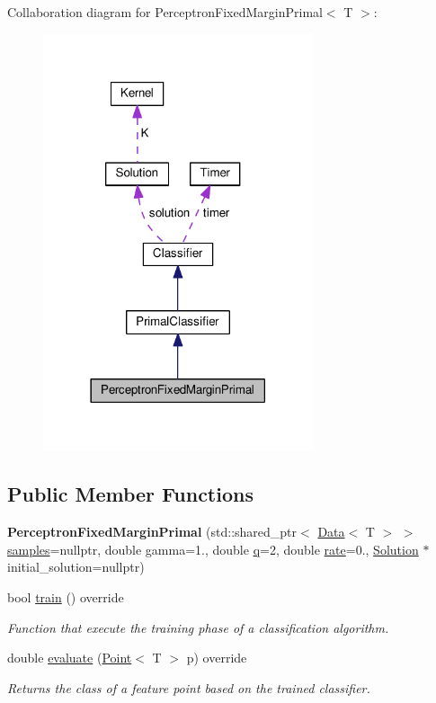 Collaboration diagram for Perceptron\+Fixed\+Margin\+Primal$<$ T $>$\+:\nopagebreak
\begin{figure}[H]
\begin{center}
\leavevmode
\includegraphics[width=225pt]{class_perceptron_fixed_margin_primal__coll__graph}
\end{center}
\end{figure}
\subsection*{Public Member Functions}
\begin{DoxyCompactItemize}
\item 
\mbox{\label{class_perceptron_fixed_margin_primal_ac0352938dd986cda1b44c45040a2d46f}} 
{\bfseries Perceptron\+Fixed\+Margin\+Primal} (std\+::shared\+\_\+ptr$<$ \hyperlink{class_data}{Data}$<$ T $>$ $>$ \hyperlink{class_classifier_a0000b47a2e0784ada4c52d7046c4adb8}{samples}=nullptr, double gamma=1., double \hyperlink{class_primal_classifier_ae30c00c25bce4b1623baa54b5e2812b4}{q}=2, double \hyperlink{class_classifier_a7b1c4ef87631bd9e46682e5bc4315111}{rate}=0., \hyperlink{class_solution}{Solution} $\ast$initial\+\_\+solution=nullptr)
\item 
bool \hyperlink{class_perceptron_fixed_margin_primal_a6d4a14b9f39a4fef45de201edfeabce0}{train} () override
\begin{DoxyCompactList}\small\item\em Function that execute the training phase of a classification algorithm. \end{DoxyCompactList}\item 
double \hyperlink{class_perceptron_fixed_margin_primal_a5bfe0f03533361017b594c3fe67f0905}{evaluate} (\hyperlink{class_point}{Point}$<$ T $>$ p) override
\begin{DoxyCompactList}\small\item\em Returns the class of a feature point based on the trained classifier. \end{DoxyCompactList}\end{DoxyCompactItemize}

